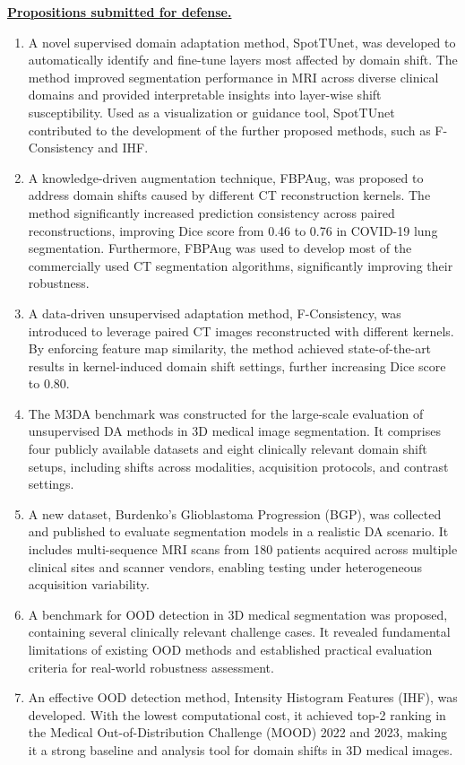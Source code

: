 

\underline{\textbf{Propositions submitted for defense.}}

\begin{enumerate}
	
	\item A novel supervised domain adaptation method, SpotTUnet, was developed to automatically identify and fine-tune layers most affected by domain shift. The method improved segmentation performance in MRI across diverse clinical domains and provided interpretable insights into layer-wise shift susceptibility. Used as a visualization or guidance tool, SpotTUnet contributed to the development of the further proposed methods, such as F-Consistency and IHF.
	\item A knowledge-driven augmentation technique, FBPAug, was proposed to address domain shifts caused by different CT reconstruction kernels. The method significantly increased prediction consistency across paired reconstructions, improving Dice score from 0.46 to 0.76 in COVID-19 lung segmentation. Furthermore, FBPAug was used to develop most of the commercially used CT segmentation algorithms, significantly improving their robustness.
	\item A data-driven unsupervised adaptation method, F-Consistency, was introduced to leverage paired CT images reconstructed with different kernels. By enforcing feature map similarity, the method achieved state-of-the-art results in kernel-induced domain shift settings, further increasing Dice score to 0.80.
	\item The M3DA benchmark was constructed for the large-scale evaluation of unsupervised DA methods in 3D medical image segmentation. It comprises four publicly available datasets and eight clinically relevant domain shift setups, including shifts across modalities, acquisition protocols, and contrast settings.
	\item A new dataset, Burdenko’s Glioblastoma Progression (BGP), was collected and published to evaluate segmentation models in a realistic DA scenario. It includes multi-sequence MRI scans from 180 patients acquired across multiple clinical sites and scanner vendors, enabling testing under heterogeneous acquisition variability.
	\item A benchmark for OOD detection in 3D medical segmentation was proposed, containing several clinically relevant challenge cases. It revealed fundamental limitations of existing OOD methods and established practical evaluation criteria for real-world robustness assessment.
	\item An effective OOD detection method, Intensity Histogram Features (IHF), was developed. With the lowest computational cost, it achieved top-2 ranking in the Medical Out-of-Distribution Challenge (MOOD) 2022 and 2023, making it a strong baseline and analysis tool for domain shifts in 3D medical images.


\end{enumerate}
